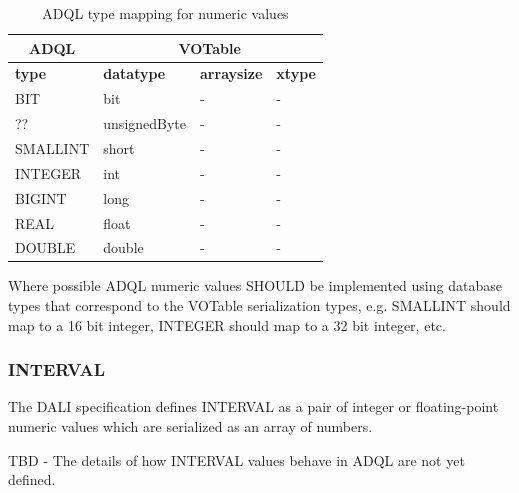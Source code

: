 \documentclass[11pt,a4paper]{ivoa}
\newcommand{\DALIspec}{DALI specification\xspace}
\begin{document}
\begin{table}[thm]\footnotesize
    \begin{tabular}
        {|p{}|p{}|p{}|p{}|}
        \hline

        \hline
        \multicolumn{1}{|c|}{\textbf{ADQL}} &
        \multicolumn{3}{|c|}{\textbf{VOTable}}
        \tabularnewline
        
        \hline
        \textbf{type} &
        \textbf{datatype} &
        \textbf{arraysize} &
        \textbf{xtype}
        \tabularnewline

        \hline
        BIT &
        bit &
        - &
        -
        \tabularnewline

        \hline
        ?? &
        unsignedByte &
        - &
        -
        \tabularnewline

        \hline
        SMALLINT &
        short &
        - &
        -
        \tabularnewline

        \hline
        INTEGER &
        int &
        - &
        -
        \tabularnewline

        \hline
        BIGINT &
        long &
        - &
        -
        \tabularnewline

        \hline
        REAL &
        float &
        - &
        -
        \tabularnewline

        \hline
        DOUBLE &
        double &
        - &
        -
        \tabularnewline

        \hline
    \end{tabular}
    \caption{ADQL type mapping for numeric values}
    \label{table:types.numeric.primitive}
\end{table}

Where possible ADQL numeric values SHOULD be implemented using database types
that correspond to the VOTable serialization types, e.g. SMALLINT should map to a
16 bit integer, INTEGER should map to a 32 bit integer, etc. 

\subsubsection{INTERVAL}
\label{sec:types.numeric.interval}

The \DALIspec defines INTERVAL as a pair of integer or floating-point
numeric values which are serialized as an array of numbers.

TBD - The details of how INTERVAL values behave in ADQL are not yet defined.
\end{document}
